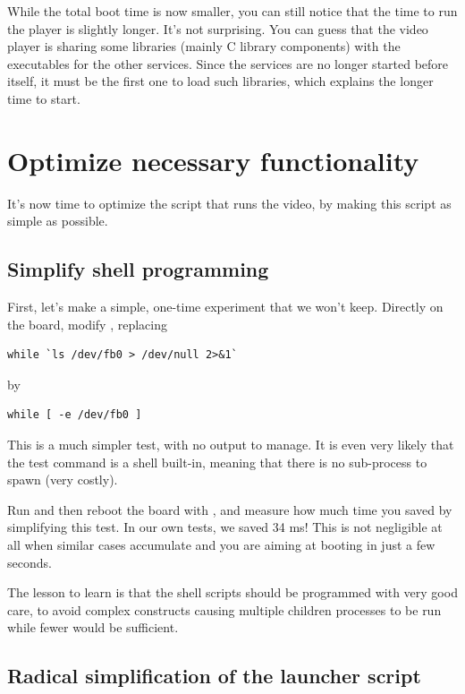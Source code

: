 While the total boot time is now smaller, you can still notice
that the time to run the player is slightly longer. It's not surprising.
You can guess that the video player is sharing some libraries (mainly C
library components) with the executables for the other services. Since
the services are no longer started before itself, it must be the first
one to load such libraries, which explains the longer time to start.

\section{Optimize necessary functionality}

It's now time to optimize the  script that runs the video,
by making this script as simple as possible.

\subsection{Simplify shell programming}

First, let's make a simple, one-time experiment that we won't keep.
Directly on the board, modify , replacing

\begin{verbatim}
while `ls /dev/fb0 > /dev/null 2>&1`
\end{verbatim}

by 

\begin{verbatim}
while [ -e /dev/fb0 ] 
\end{verbatim}

This is a much simpler test, with no output to manage. It is even
very likely that the test command is a shell built-in, meaning that
there is no sub-process to spawn (very costly).

Run  and then reboot the board with ,
and measure how much time you saved by simplifying this test.
In our own tests, we saved 34 ms! This is not negligible at all
when similar cases accumulate and you are aiming at booting in just
a few seconds.

The lesson to learn is that the shell scripts should be programmed
with very good care, to avoid complex constructs causing multiple
children processes to be run while fewer would be sufficient.

\subsection{Radical simplification of the launcher script}

